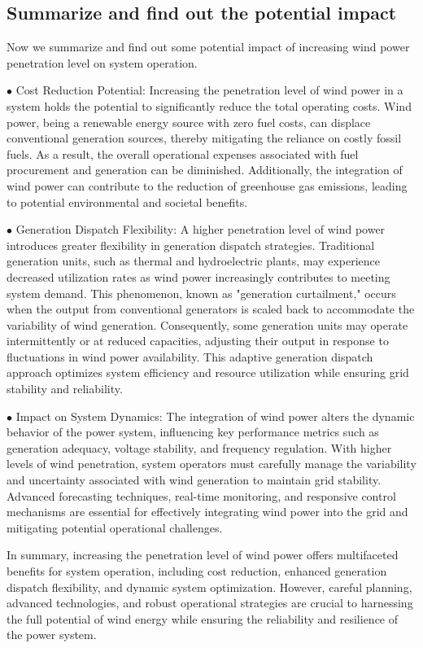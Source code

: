 \documentclass[lettersize,journal]{IEEEtran}
\begin{document}
\subsection{Summarize and find out the potential impact}
Now we summarize and find out some potential impact of increasing wind power penetration level on system operation.

$\bullet$ Cost Reduction Potential: Increasing the penetration level of wind power in a system holds the potential to significantly reduce the total operating costs. Wind power, being a renewable energy source with zero fuel costs, can displace conventional generation sources, thereby mitigating the reliance on costly fossil fuels. As a result, the overall operational expenses associated with fuel procurement and generation can be diminished. Additionally, the integration of wind power can contribute to the reduction of greenhouse gas emissions, leading to potential environmental and societal benefits.

$\bullet$ Generation Dispatch Flexibility: A higher penetration level of wind power introduces greater flexibility in generation dispatch strategies. Traditional generation units, such as thermal and hydroelectric plants, may experience decreased utilization rates as wind power increasingly contributes to meeting system demand. This phenomenon, known as "generation curtailment," occurs when the output from conventional generators is scaled back to accommodate the variability of wind generation. Consequently, some generation units may operate intermittently or at reduced capacities, adjusting their output in response to fluctuations in wind power availability. This adaptive generation dispatch approach optimizes system efficiency and resource utilization while ensuring grid stability and reliability.

$\bullet$ Impact on System Dynamics: The integration of wind power alters the dynamic behavior of the power system, influencing key performance metrics such as generation adequacy, voltage stability, and frequency regulation. With higher levels of wind penetration, system operators must carefully manage the variability and uncertainty associated with wind generation to maintain grid stability. Advanced forecasting techniques, real-time monitoring, and responsive control mechanisms are essential for effectively integrating wind power into the grid and mitigating potential operational challenges.

In summary, increasing the penetration level of wind power offers multifaceted benefits for system operation, including cost reduction, enhanced generation dispatch flexibility, and dynamic system optimization. However, careful planning, advanced technologies, and robust operational strategies are crucial to harnessing the full potential of wind energy while ensuring the reliability and resilience of the power system.
\end{document}
